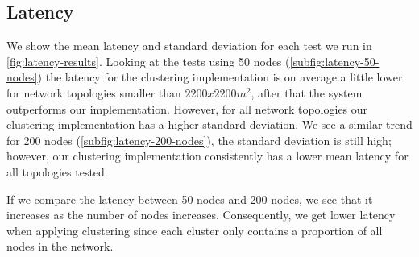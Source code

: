 \subsection{Latency}
We show the mean latency and standard deviation for each test we run in \cref{fig:latency-results}. Looking at the tests using 50 nodes (\cref{subfig:latency-50-nodes}) the latency for the clustering implementation is on average a little lower for network topologies smaller than $2200x2200m^2$, after that the \atwo{} system outperforms our implementation. However, for all network topologies our clustering implementation has a higher standard deviation. We see a similar trend for 200 nodes (\cref{subfig:latency-200-nodes}), the standard deviation is still high; however, our clustering implementation consistently has a lower mean latency for all topologies tested. 

If we compare the latency between 50 nodes and 200 nodes, we see that it increases as the number of nodes increases. Consequently, we get lower latency when applying clustering since each cluster only contains a proportion of all nodes in the network.




